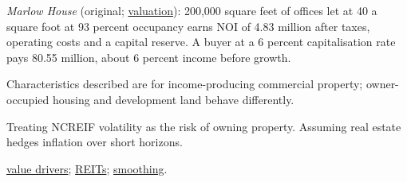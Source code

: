 \begin{qfdefinition}
 \emph{Marlow House} (original; \hyperref[meth:real-estate-valuation-indexes]{valuation}): 200,000 square feet of offices let at 40 a square foot at 93 percent occupancy earns NOI of 4.83 million after taxes, operating costs and a capital reserve. A buyer at a 6 percent capitalisation rate pays 80.55 million, about 6 percent income before growth.

 Characteristics described are for income-producing commercial property; owner-occupied housing and development land behave differently.

 Treating NCREIF volatility as the risk of owning property. Assuming real estate hedges inflation over short horizons.

 \hyperref[meth:real-estate-value-drivers]{value drivers}; \hyperref[meth:reit-valuation]{REITs}; \hyperref[meth:private-capital-diversification]{smoothing}.

\end{qfdefinition}

